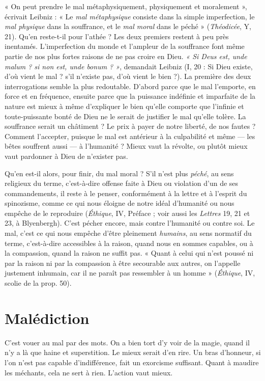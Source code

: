 « On peut prendre le mal métaphysiquement, physiquement et moralement »,
écrivait Leibniz : « Le {\it mal métaphysique} consiste dans la simple imperfection,
le {\it mal physique} dans la souffrance, et le {\it mal moral} dans le péché »
({\it Théodicée}, Y, 21). Qu'en reste-t-il pour l’athée ? Les deux premiers restent à
peu près inentamés. L’imperfection du monde et l’ampleur de la souffrance
font même partie de nos plus fortes raisons de ne pas croire en Dieu. {\it « Si
Deus est, unde malum ? si non est, unde bonum ? »}, demandait Leibniz (I, 20 :
Si Dieu existe, d’où vient le mal ? s’il n’existe pas, d’où vient le bien ?). La
première des deux interrogations semble la plus redoutable. D'abord parce
que le mal l'emporte, en force et en fréquence, ensuite parce que la puissance
indéfinie et imparfaite de la nature est mieux à même d’expliquer le bien
qu'elle comporte que l’infinie et toute-puissante bonté de Dieu ne le serait de
justifier le mal qu’elle tolère. La souffrance serait un châtiment ? Le prix à
payer de notre liberté, de nos fautes ? Comment l’accepter, puisque le mal est
antérieur à la culpabilité et même — les bêtes souffrent aussi — à l'humanité ?
Mieux vaut la révolte, ou plutôt mieux vaut pardonner à Dieu de n’exister
pas.

Qu'en est-il alors, pour finir, du mal moral ? S'il n’est plus {\it péché}, au sens
religieux du terme, c’est-à-dire offense faite à Dieu ou violation d’un de ses
commandements, il reste à le penser, conformément à la lettre et à l'esprit du
spinozisme, comme ce qui nous éloigne de notre idéal d'humanité ou nous
empêche de le reproduire ({\it Éthique}, IV, Préface ; voir aussi les {\it Lettres} 19, 21 et
23, à Blyenbergh). C’est pécher encore, mais contre l'humanité ou contre soi.
Le mal, c’est ce qui nous empêche d’être pleinement {\it humains}, au sens normatif
du terme, c’est-à-dire accessibles à la raison, quand nous en sommes capables,
ou à la compassion, quand la raison ne suffit pas. « Quant à celui qui n’est
poussé ni par la raison ni par la compassion à être secourable aux autres, on
l'appelle justement inhumain, car il ne paraît pas ressembler à un homme »
({\it Éthique}, IV, scolie de la prop. 50).

\section{Malédiction}
C’est vouer au mal par des mots. On a bien tort d’y voir
de la magie, quand il n’y a là que haine et superstition. Le
mieux serait d’en rire. Un bras d'honneur, si l’on n’est pas capable d’indifférence,
fait un exorcisme suffisant.
Quant à maudire les méchants, cela ne sert à rien. L'action vaut mieux.

